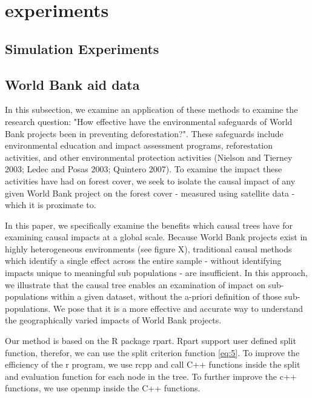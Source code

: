 \section{experiments}



\subsection{Simulation Experiments}



\subsection{World Bank aid data}

In this subsection, we examine an application of these methods to examine the research question: "How effective have the environmental safeguards of World Bank projects been in preventing deforestation?".  
These safeguards include environmental education and impact assessment programs, reforestation activities, and other environmental protection activities (Nielson and Tierney 2003; Ledec and Posas 2003; Quintero 2007). 
To examine the impact these activities have had on forest cover, we seek to isolate the causal impact of any given World Bank project on the forest cover - measured using satellite data - which it is proximate to.  
\par
In this paper, we specifically examine the benefits which causal trees have for examining causal impacts at a global scale.  
Because World Bank projects exist in highly heterogeneous environments (see figure X), traditional causal methods which identify a single effect across the entire sample - without identifying impacts unique to meaningful sub populations - are insufficient.  
In this approach, we illustrate that the causal tree enables an examination of impact on sub-populations within a given dataset, without the a-priori definition of those sub-populations.
We pose that it is a more effective and accurate way to understand the geographically varied impacts of World Bank projects.
\par

Our method is based on the R package rpart. Rpart support user defined split function, therefor, we can use the split criterion function \ref{eq:5}. To improve the efficiency of the r program, we use rcpp and call C++ functions inside the split and evaluation function for each node in the tree. To further improve the c++ functions, we use openmp inside the C++ functions. 